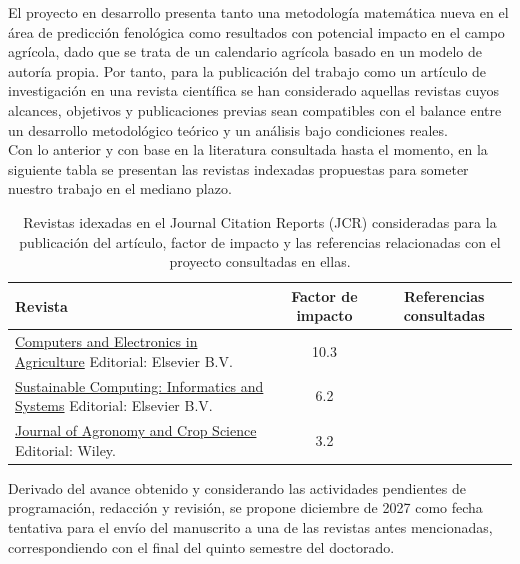 El proyecto en desarrollo presenta tanto una metodología matemática nueva en el área de predicción fenológica como resultados con potencial impacto en el campo agrícola, dado que se trata de un calendario agrícola basado en un modelo de autoría propia. Por tanto, para la publicación del trabajo como un artículo de investigación en una revista científica se han considerado aquellas revistas cuyos alcances, objetivos y publicaciones previas sean compatibles con el balance entre un desarrollo metodológico teórico y un análisis bajo condiciones reales.\\

Con lo anterior y con base en la literatura consultada hasta el momento, en la siguiente tabla se presentan las revistas indexadas propuestas para someter nuestro trabajo en el mediano plazo.\\


\begin{table}[h]
	\centering
	\begin{tabular}{p{7.5cm}|c|c}
		\hline
		\textbf{Revista} & \textbf{Factor de impacto} & \textbf{Referencias consultadas} \\
		\hline
		\href{https://www.sciencedirect.com/journal/computers-and-electronics-in-agriculture/about/aims-and-scope}{Computers and Electronics in Agriculture}\newline
		Editorial: Elsevier B.V.
		& 10.3
		& \cite{Elnesr_2013} \\ \hline
		\href{https://www.sciencedirect.com/journal/sustainable-computing-informatics-and-systems}{Sustainable Computing: Informatics and Systems}\newline
		Editorial: Elsevier B.V.
		& 6.2
		& \cite{GUMUSCU2020100308} \\ \hline
		\href{https://onlinelibrary.wiley.com/journal/1439037x}{Journal of Agronomy and Crop Science}\newline
		Editorial: Wiley.
		& 3.2
		& \cite{Parker_2016} \\ 
		\hline
	\end{tabular}
	\caption{Revistas idexadas en el Journal Citation Reports (JCR)   consideradas para la publicación del artículo, factor de impacto y las referencias relacionadas con el proyecto consultadas en ellas.}
	\label{tab:journals}
\end{table}


Derivado del avance obtenido y considerando las actividades pendientes de programación, redacción y revisión, se propone diciembre de 2027 como fecha tentativa para el envío del manuscrito a una de las revistas antes mencionadas, correspondiendo con el final del quinto semestre del doctorado.
